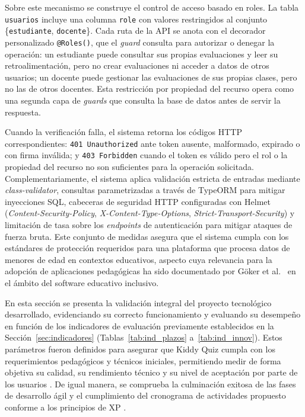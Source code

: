 Sobre este mecanismo se construye el control de acceso basado en roles. La
tabla \texttt{usuarios} incluye una columna \texttt{role} con valores
restringidos al conjunto \{\texttt{estudiante}, \texttt{docente}\}. Cada
ruta de la API se anota con el decorador personalizado \texttt{@Roles()},
que el \textit{guard} consulta para autorizar o denegar la operación: un
estudiante puede consultar sus propias evaluaciones y leer su
retroalimentación, pero no crear evaluaciones ni acceder a datos de otros
usuarios; un docente puede gestionar las evaluaciones de sus propias clases,
pero no las de otros docentes. Esta restricción por propiedad del recurso
opera como una segunda capa de \textit{guards} que consulta la base de
datos antes de servir la respuesta.
 
Cuando la verificación falla, el sistema retorna los códigos HTTP
correspondientes: \texttt{401 Unauthorized} ante token ausente, malformado,
expirado o con firma inválida; y \texttt{403 Forbidden} cuando el token es
válido pero el rol o la propiedad del recurso no son suficientes para la
operación solicitada. Complementariamente, el sistema aplica validación
estricta de entradas mediante \textit{class-validator}, consultas
parametrizadas a través de TypeORM para mitigar inyecciones SQL, cabeceras
de seguridad HTTP configuradas con Helmet
(\textit{Content-Security-Policy}, \textit{X-Content-Type-Options},
\textit{Strict-Transport-Security}) y limitación de tasa sobre los
\textit{endpoints} de autenticación para mitigar ataques de fuerza bruta.
Este conjunto de medidas asegura que el sistema cumpla con los estándares
de protección requeridos para una plataforma que procesa datos de menores
de edad en contextos educativos, aspecto cuya relevancia para la adopción
de aplicaciones pedagógicas ha sido documentado por Göker et
al.\ \cite{goker2016usability} en el ámbito del software educativo inclusivo.
 
En esta sección se presenta la validación integral del proyecto tecnológico desarrollado, evidenciando su correcto funcionamiento y evaluando su desempeño en función de los indicadores de evaluación previamente establecidos en la Sección~\ref{sec:indicadores} (Tablas~\ref{tab:ind_plazos} a~\ref{tab:ind_innov}). Estos parámetros fueron definidos para asegurar que Kiddy Quiz cumpla con los requerimientos pedagógicos y técnicos iniciales, permitiendo medir de forma objetiva su calidad, su rendimiento técnico y su nivel de aceptación
por parte de los usuarios \cite{brooke1996sus,davis1989tam}. De igual manera, se comprueba la culminación exitosa de las fases de desarrollo ágil y el cumplimiento del cronograma de actividades propuesto conforme a los principios de XP \cite{beck2004xp,dyba2008agile}.

